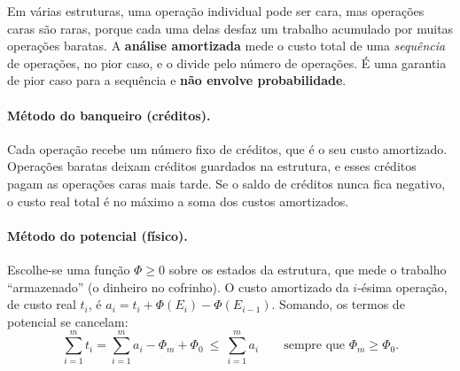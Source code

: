 Em várias estruturas, uma operação individual pode ser cara, mas operações caras são raras, porque cada uma delas desfaz um trabalho acumulado por muitas operações baratas. A \textbf{análise amortizada} mede o custo total de uma \emph{sequência} de operações, no pior caso, e o divide pelo número de operações. É uma garantia de pior caso para a sequência e \textbf{não envolve probabilidade}.

\paragraph{Método do banqueiro (créditos).} Cada operação recebe um número fixo de créditos, que é o seu custo amortizado. Operações baratas deixam créditos guardados na estrutura, e esses créditos pagam as operações caras mais tarde. Se o saldo de créditos nunca fica negativo, o custo real total é no máximo a soma dos custos amortizados.

\paragraph{Método do potencial (físico).} Escolhe-se uma função $\Phi\ge0$ sobre os estados da estrutura, que mede o trabalho ``armazenado'' (o dinheiro no cofrinho). O custo amortizado da $i$-ésima operação, de custo real $t_i$, é $a_i=t_i+\Phi(E_i)-\Phi(E_{i-1})$. Somando, os termos de potencial se cancelam:
\[
\sum_{i=1}^m t_i=\sum_{i=1}^m a_i-\Phi_m+\Phi_0\ \le\ \sum_{i=1}^m a_i\qquad\text{sempre que }\Phi_m\ge\Phi_0 .
\]

